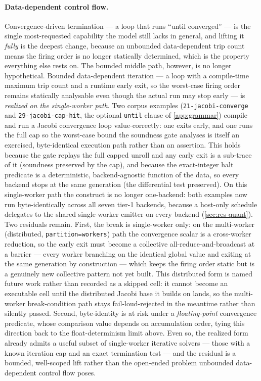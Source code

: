 \paragraph{Data-dependent control flow.} Convergence-driven termination --- a loop
that runs ``until converged'' --- is the single most-requested capability the model
still lacks in general, and lifting it \emph{fully} is the deepest change, because an
unbounded data-dependent trip count means the firing order is no longer statically
determined, which is the property everything else rests on. The bounded middle path,
however, is no longer hypothetical. Bounded data-dependent iteration --- a loop with a
compile-time maximum trip count and a runtime early exit, so the worst-case firing
order remains statically analysable even though the actual run may stop early --- is
\emph{realized on the single-worker path}. Two corpus examples
(\texttt{21-jacobi-converge} and \texttt{29-jacobi-cap-hit}, the optional
\texttt{until} clause of \cref{app:grammar}) compile and run a Jacobi convergence
loop value-correctly: one exits early, and one runs the full cap so the worst-case
bound the soundness gate analyses is itself an exercised, byte-identical execution
path rather than an assertion. This holds because the gate replays the full capped
unroll and any early exit is a sub-trace of it (soundness preserved by the cap), and
because the exact-integer halt predicate is a deterministic, backend-agnostic
function of the data, so every backend stops at the same generation (the differential
test preserved). On this single-worker path the construct is no longer one-backend: both
examples now run byte-identically across all seven tier-1 backends, because a host-only
schedule delegates to the shared single-worker emitter on every backend
(\cref{sec:res-quant}). Two residuals remain. First, the break is single-worker only: on the
multi-worker (distributed, \texttt{partition=workers}) path the convergence scalar is a
cross-worker reduction, so the early
exit must become a collective all-reduce-and-broadcast at a barrier --- every worker
branching on the identical global value and exiting at the same generation by
construction --- which keeps the firing order static but is a genuinely new collective
pattern not yet built. This distributed form is named future work rather than recorded as
a skipped cell: it cannot become an executable cell until the distributed Jacobi base it
builds on lands, so the multi-worker break-condition path stays fail-loud-rejected in the
meantime rather than silently passed.
Second, byte-identity is at risk under a \emph{floating-point} convergence predicate,
whose comparison value depends on accumulation order, tying this direction back to the
float-determinism limit above. Even so, the realized form already admits a useful
subset of single-worker iterative solvers --- those with a known iteration cap and an
exact termination test --- and the residual is a bounded, well-scoped lift rather than
the open-ended problem unbounded data-dependent control flow poses.

